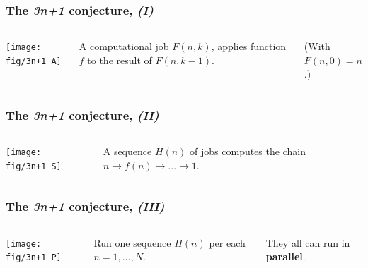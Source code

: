 \documentclass[english,serif,mathserif,xcolor=pdftex,dvipsnames,table]{beamer}
\begin{document}
\begin{frame}
  \frametitle{The \emph{3n+1} conjecture, \emph{(I)}}
  \label{sec:7}

  \+
  \begin{columns}[c]
    \texttt{[image: fig/3n+1\_A]}

    A computational job $F(n,k)$, applies
    function $f$ to the result of $F(n,k-1)$.

    \+
    (With $F(n,0) = n$.)
  \end{columns}
\end{frame}

\begin{frame}
  \frametitle{The \emph{3n+1} conjecture, \emph{(II)}}
  \label{sec:7b}

  \+
  \begin{columns}[c]
    \texttt{[image: fig/3n+1\_S]}

    A sequence $H(n)$ of jobs computes the
    chain $n \to f(n) \to ... \to 1$.
  \end{columns}
\end{frame}

\begin{frame}
  \frametitle{The \emph{3n+1} conjecture, \emph{(III)}}
  \label{sec:7c}

  \+
  \begin{columns}[c]
    \texttt{[image: fig/3n+1\_P]}

    Run one sequence $H(n)$ per each $n = 1, \ldots, N$.

    \+
    They all can run in \textbf{parallel}.
  \end{columns}
\end{frame}
\end{document}
